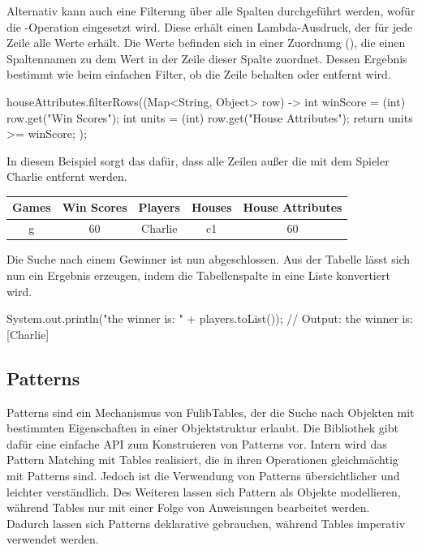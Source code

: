 Alternativ kann auch eine Filterung über alle Spalten durchgeführt werden, wofür die -Operation eingesetzt wird.
Diese erhält einen Lambda-Ausdruck, der für jede Zeile alle Werte erhält.
Die Werte befinden sich in einer Zuordnung (), die einen Spaltennamen zu dem Wert in der Zeile dieser Spalte zuordnet.
Dessen Ergebnis bestimmt wie beim einfachen Filter, ob die Zeile behalten oder entfernt wird.

\begin{jcodeblock}
    houseAttributes.filterRows((Map<String, Object> row) -> {
        int winScore = (int) row.get("Win Scores");
        int units = (int) row.get("House Attributes");
        return units >= winScore;
    });
\end{jcodeblock}

In diesem Beispiel sorgt das dafür, dass alle Zeilen außer die mit dem Spieler Charlie entfernt werden.

\begin{tabular}{|c|c|c|c|c|}
    \hline
    \textbf{Games} & \textbf{Win Scores} & \textbf{Players} & \textbf{Houses} & \textbf{House Attributes} \\
    \hline
    g & 60 & Charlie & c1 & 60 \\
    \hline
\end{tabular}

Die Suche nach einem Gewinner ist nun abgeschlossen.
Aus der Tabelle lässt sich nun ein Ergebnis erzeugen, indem die Tabellenspalte  in eine Liste konvertiert wird.

\begin{jcodeblock}
    System.out.println("the winner is: " + players.toList());
    // Output: the winner is: [Charlie]
\end{jcodeblock}

\subsection{Patterns}\label{subsec:patterns}

Patterns sind ein Mechanismus von FulibTables, der die Suche nach Objekten mit bestimmten Eigenschaften in einer Objektstruktur erlaubt.
Die Bibliothek gibt dafür eine einfache API zum Konstruieren von Patterns vor.
Intern wird das Pattern Matching mit Tables realisiert,
die in ihren Operationen gleichmächtig mit Patterns sind.
Jedoch ist die Verwendung von Patterns übersichtlicher und leichter verständlich.
Des Weiteren lassen sich Pattern als Objekte modellieren,
während Tables nur mit einer Folge von Anweisungen bearbeitet werden.
Dadurch lassen sich Patterns deklarative gebrauchen, während Tables imperativ verwendet werden.


